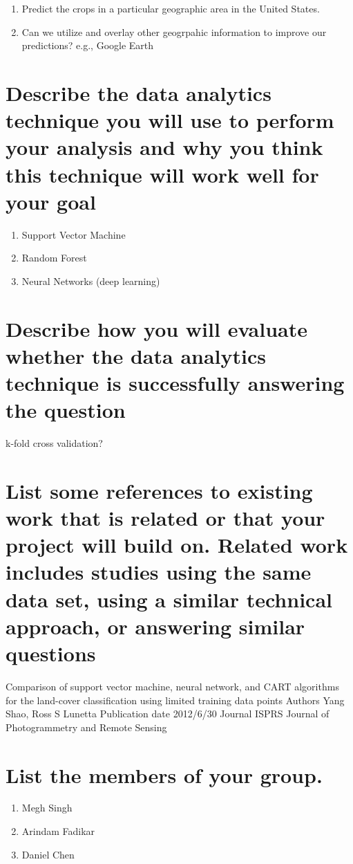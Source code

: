 \documentclass[10pt,letterpaper]{article}
\begin{document}
\begin{enumerate}
	\item Predict the crops in a particular geographic area in the United States.
	\item Can we utilize and overlay other geogrpahic information to improve our predictions? e.g., Google Earth
\end{enumerate}



\section{Describe the data analytics technique you will use to perform your analysis and why you think this technique will work well for your goal}

\begin{enumerate}
	\item Support Vector Machine
	\item Random Forest
	\item Neural Networks (deep learning)
\end{enumerate}

\section{Describe how you will evaluate whether the data analytics technique is successfully answering the question}

k-fold cross validation?

\section{List some references to existing work that is related or that your project will build on. Related work includes studies using the same data set, using a similar technical approach, or answering similar questions}

Comparison of support vector machine, neural network, and CART algorithms for the land-cover classification using limited training data points
Authors
Yang Shao, Ross S Lunetta
Publication date
2012/6/30
Journal
ISPRS Journal of Photogrammetry and Remote Sensing

\section{List the members of your group.}

\begin{enumerate}
	\item Megh Singh
	\item Arindam Fadikar
	\item Daniel Chen
\end{enumerate}
\end{document}
